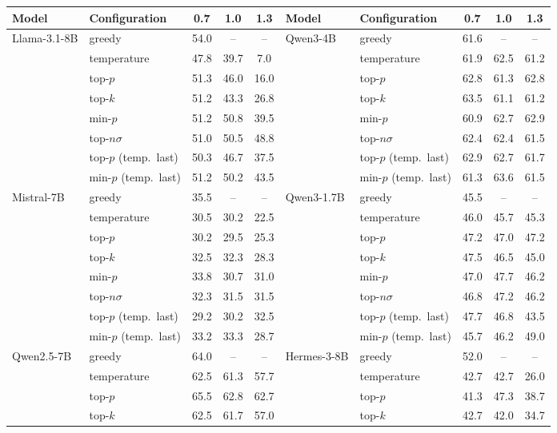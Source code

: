 \begin{tabular}{llccc@{\hspace{14pt}}llccc}
\toprule
Model & Configuration & 0.7 & 1.0 & 1.3 & Model & Configuration & 0.7 & 1.0 & 1.3 \\
\midrule
Llama-3.1-8B & greedy & 54.0 & -- & -- & Qwen3-4B & greedy & 61.6 & -- & -- \\
 & temperature & 47.8 & 39.7 & 7.0 &  & temperature & 61.9 & 62.5 & 61.2 \\
 & top-$p$ & 51.3 & 46.0 & 16.0 &  & top-$p$ & 62.8 & 61.3 & 62.8 \\
 & top-$k$ & 51.2 & 43.3 & 26.8 &  & top-$k$ & 63.5 & 61.1 & 61.2 \\
 & min-$p$ & 51.2 & 50.8 & 39.5 &  & min-$p$ & 60.9 & 62.7 & 62.9 \\
 & top-$n\sigma$ & 51.0 & 50.5 & 48.8 &  & top-$n\sigma$ & 62.4 & 62.4 & 61.5 \\
 & top-$p$ (temp.\ last) & 50.3 & 46.7 & 37.5 &  & top-$p$ (temp.\ last) & 62.9 & 62.7 & 61.7 \\
 & min-$p$ (temp.\ last) & 51.2 & 50.2 & 43.5 &  & min-$p$ (temp.\ last) & 61.3 & 63.6 & 61.5 \\
\midrule
Mistral-7B & greedy & 35.5 & -- & -- & Qwen3-1.7B & greedy & 45.5 & -- & -- \\
 & temperature & 30.5 & 30.2 & 22.5 &  & temperature & 46.0 & 45.7 & 45.3 \\
 & top-$p$ & 30.2 & 29.5 & 25.3 &  & top-$p$ & 47.2 & 47.0 & 47.2 \\
 & top-$k$ & 32.5 & 32.3 & 28.3 &  & top-$k$ & 47.5 & 46.5 & 45.0 \\
 & min-$p$ & 33.8 & 30.7 & 31.0 &  & min-$p$ & 47.0 & 47.7 & 46.2 \\
 & top-$n\sigma$ & 32.3 & 31.5 & 31.5 &  & top-$n\sigma$ & 46.8 & 47.2 & 46.2 \\
 & top-$p$ (temp.\ last) & 29.2 & 30.2 & 32.5 &  & top-$p$ (temp.\ last) & 47.7 & 46.8 & 43.5 \\
 & min-$p$ (temp.\ last) & 33.2 & 33.3 & 28.7 &  & min-$p$ (temp.\ last) & 45.7 & 46.2 & 49.0 \\
\midrule
Qwen2.5-7B & greedy & 64.0 & -- & -- & Hermes-3-8B & greedy & 52.0 & -- & -- \\
 & temperature & 62.5 & 61.3 & 57.7 &  & temperature & 42.7 & 42.7 & 26.0 \\
 & top-$p$ & 65.5 & 62.8 & 62.7 &  & top-$p$ & 41.3 & 47.3 & 38.7 \\
 & top-$k$ & 62.5 & 61.7 & 57.0 &  & top-$k$ & 42.7 & 42.0 & 34.7 \\

\end{tabular}
